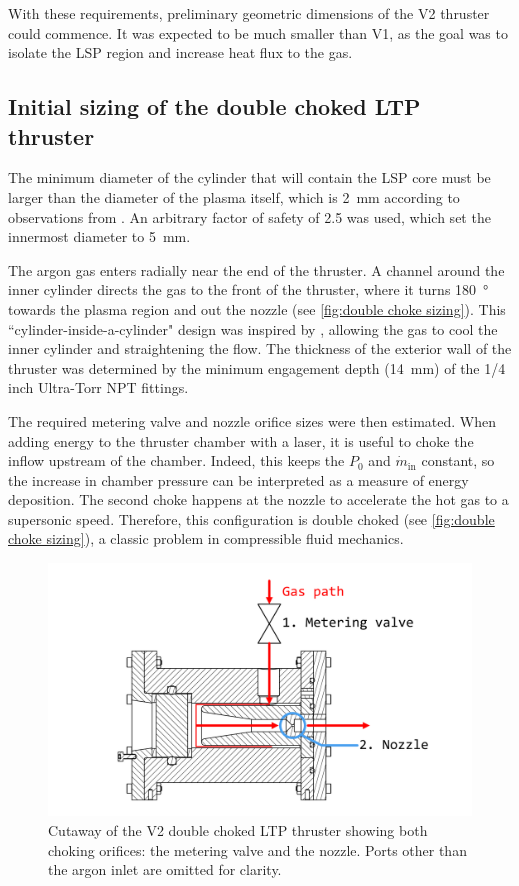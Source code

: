             With these requirements, preliminary geometric dimensions of the V2 thruster could commence. It was expected to be much smaller than V1, as the goal was to isolate the LSP region and increase heat flux to the gas.

        \subsection{Initial sizing of the double choked LTP thruster}

            The minimum diameter of the cylinder that will contain the LSP core must be larger than the diameter of the plasma itself, which is \qty{2}{mm} according to observations from \textcite{duplayArgonLaserPlasmaThruster2024a}. An arbitrary factor of safety of 2.5 was used, which set the innermost diameter to \qty{5}{mm}.

            The argon gas enters radially near the end of the thruster. A channel around the inner cylinder directs the gas to the front of the thruster, where it turns \qty{180}{\degree} towards the plasma region and out the nozzle (see \autoref{fig:double choke sizing}). This ``cylinder-inside-a-cylinder" design was inspired by \textcite{toyodaThrustPerformanceCW2002}, allowing the gas to cool the inner cylinder and straightening the flow. The thickness of the exterior wall of the thruster was determined by the minimum engagement depth (\qty{14}{mm}) of the 1/4 inch Ultra-Torr NPT fittings.

            The required metering valve and nozzle orifice sizes were then estimated. When adding energy to the thruster chamber with a laser, it is useful to choke the inflow upstream of the chamber. Indeed, this keeps the $P_0$ and $\dot{m}_\mathrm{in}$ constant, so the increase in chamber pressure can be interpreted as a measure of energy deposition. The second choke happens at the nozzle to accelerate the hot gas to a supersonic speed. Therefore, this configuration is double choked (see \autoref{fig:double choke sizing}), a classic problem in compressible fluid mechanics.

            \begin{figure}[h]
                \centering
                \includegraphics[width=0.8\linewidth]{assets/3 design/Double choked LTP thruster.pdf}
                \caption{Cutaway of the V2 double choked LTP thruster showing both choking orifices: the metering valve and the nozzle. Ports other than the argon inlet are omitted for clarity.}
                \label{fig:double choke sizing}
            \end{figure}
            

